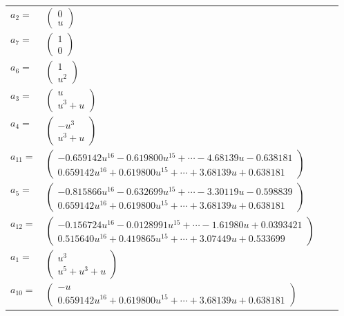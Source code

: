 \documentclass[1p]{elsarticle_modified}
\theoremstyle{definition}
\begin{document}
\begin{tabular}{m{7pt} m{180pt} m{7pt} m{180pt} }
\flushright $a_{2}=$&$\begin{pmatrix}0\\u\end{pmatrix}$ \\
\flushright $a_{7}=$&$\begin{pmatrix}1\\0\end{pmatrix}$ \\
\flushright $a_{6}=$&$\begin{pmatrix}1\\u^2\end{pmatrix}$ \\
\flushright $a_{3}=$&$\begin{pmatrix}u\\u^3+u\end{pmatrix}$ \\
\flushright $a_{4}=$&$\begin{pmatrix}- u^3\\u^3+u\end{pmatrix}$ \\
\flushright $a_{11}=$&$\begin{pmatrix}-0.659142 u^{16}-0.619800 u^{15}+\cdots-4.68139 u-0.638181\\0.659142 u^{16}+0.619800 u^{15}+\cdots+3.68139 u+0.638181\end{pmatrix}$ \\
\flushright $a_{5}=$&$\begin{pmatrix}-0.815866 u^{16}-0.632699 u^{15}+\cdots-3.30119 u-0.598839\\0.659142 u^{16}+0.619800 u^{15}+\cdots+3.68139 u+0.638181\end{pmatrix}$ \\
\flushright $a_{12}=$&$\begin{pmatrix}-0.156724 u^{16}-0.0128991 u^{15}+\cdots-1.61980 u+0.0393421\\0.515640 u^{16}+0.419865 u^{15}+\cdots+3.07449 u+0.533699\end{pmatrix}$ \\
\flushright $a_{1}=$&$\begin{pmatrix}u^3\\u^5+u^3+u\end{pmatrix}$ \\
\flushright $a_{10}=$&$\begin{pmatrix}- u\\0.659142 u^{16}+0.619800 u^{15}+\cdots+3.68139 u+0.638181\end{pmatrix}$ \\

\end{tabular}
\end{document}
